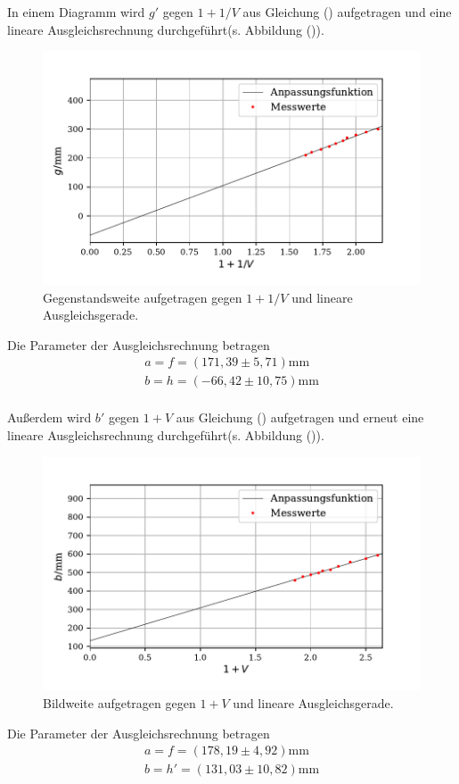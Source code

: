In einem Diagramm wird $g'$ gegen $1+1/V$ aus Gleichung () aufgetragen und eine lineare Ausgleichsrechnung durchgeführt(s. Abbildung ()).
\begin{figure}[H]
  \centering
  \includegraphics{plot2.pdf}
  \caption{Gegenstandsweite aufgetragen gegen $1+1/V$ und lineare Ausgleichsgerade.}
  \label{fig:plot}
\end{figure}
Die Parameter der Ausgleichsrechnung betragen
\begin{align*}
a = f = (171,39 \pm 5,71)\si{\milli\meter}\\
b = h = (-66,42\pm 10,75)\si{\milli\meter}\\
\end{align*}


Außerdem wird $b'$ gegen $1+V$ aus Gleichung () aufgetragen und erneut eine lineare Ausgleichsrechnung durchgeführt(s. Abbildung ()).
\begin{figure}[H]
  \centering
  \includegraphics{plot3.pdf}
  \caption{Bildweite aufgetragen gegen $1+V$ und lineare Ausgleichsgerade.}
  \label{fig:plot}
\end{figure}
Die Parameter der Ausgleichsrechnung betragen
\begin{align*}
a = f = (178,19 \pm 4,92)\si{\milli\meter}\\
b = h' = (131,03\pm 10,82)\si{\milli\meter}\\
\end{align*}

